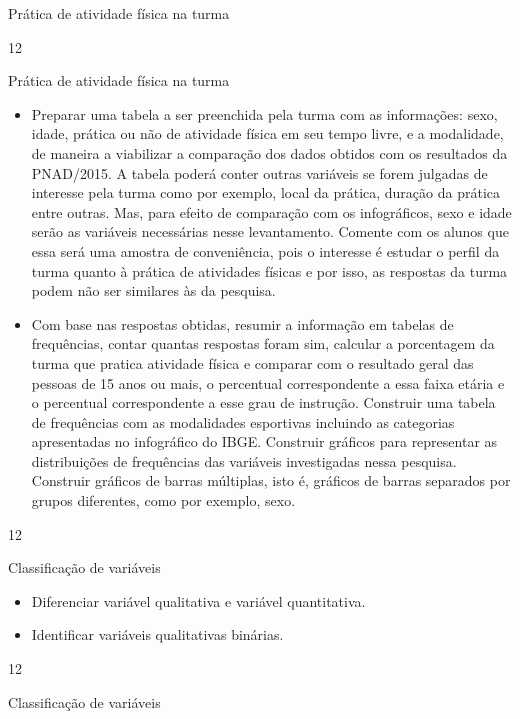 {\begin{objectives}{Prática de atividade física na turma}
{\begin{itemize}
\end{itemize}
}{1}{2}
\end{objectives}
\marginpar{\vspace{-2em}}
\begin{sugestions}{Prática de atividade física na turma}
{
\begin{itemize}
\item Preparar uma tabela a ser preenchida pela turma com as informações: sexo, idade, prática ou não de atividade física em seu tempo livre, e a modalidade, de maneira a viabilizar a comparação dos dados obtidos com os resultados da PNAD/2015. A tabela poderá conter outras variáveis se forem julgadas de interesse pela turma como por exemplo, local da prática, duração da prática entre outras. Mas, para efeito de comparação com os infográficos, sexo e idade serão as variáveis necessárias nesse levantamento. Comente com os alunos que essa será uma amostra de conveniência, pois o interesse é estudar o perfil da turma quanto à prática de atividades físicas e por isso, as respostas da turma podem não ser similares às da pesquisa.

\item Com base nas respostas obtidas, resumir a informação em tabelas de frequências, contar quantas respostas foram sim, calcular a porcentagem da turma que pratica atividade física e comparar com o resultado geral das pessoas de 15 anos ou mais, o percentual correspondente a essa faixa etária e o percentual correspondente a esse grau de instrução. Construir uma tabela de frequências com as modalidades esportivas incluindo as categorias apresentadas no infográfico do IBGE. Construir gráficos para representar as distribuições de frequências das variáveis investigadas nessa pesquisa. Construir gráficos de barras múltiplas, isto é, gráficos de barras separados por grupos diferentes, como por exemplo, sexo.
\end{itemize}
}{1}{2}
\end{sugestions}
\marginpar{\vspace{-2em}}
\begin{objectives}{Classificação de variáveis}
{
\begin{itemize}
\item Diferenciar variável qualitativa e variável quantitativa.
\item Identificar variáveis qualitativas binárias.
\end{itemize}
}{1}{2}
\end{objectives}
\begin{answer}{Classificação de variáveis}
{
\begin{enumerate}
 \begin{multicols}{3}
  

\end{multicols}
\end{enumerate}}
\end{answer}}
